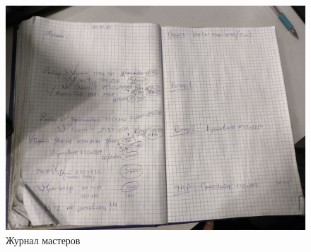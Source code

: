 \begin{figure}
\begin{center}
 \includegraphics[height=0.5\textheight, keepaspectratio]{Pics/IIIжурналмастера.jpg}
\end{center}
 \caption{Журнал мастеров}
 \label{pic:IIIжурналмастера}
\end{figure}


\clearpage